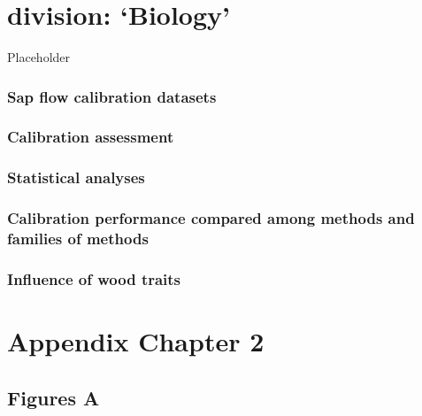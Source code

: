 \documentclass[11pt,twoside]{reedthesis}
\begin{document}
\chapter{\texorpdfstring{division:
`Biology'}{division: Biology}}\label{division-biology}

Placeholder

\subsection{Sap flow calibration
datasets}\label{sap-flow-calibration-datasets}

\subsection{Calibration assessment}\label{calibration-assessment}

\subsection{Statistical analyses}\label{statistical-analyses}

\subsection{Calibration performance compared among methods and families
of
methods}\label{calibration-performance-compared-among-methods-and-families-of-methods}

\subsection{Influence of wood traits}\label{influence-of-wood-traits}

\appendix

\chapter{Appendix Chapter 2}\label{appendix-chapter-2}

\newpage

\section{Figures A}\label{figures-a}

\setlength{\abovecaptionskip}{0pt}
\end{document}
